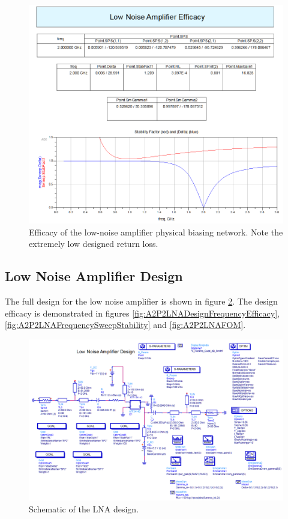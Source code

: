 \begin{figure}[H]
    \centering
    \includegraphics[width=0.8\linewidth]{Images/A2P2PhysicalResults.png}
    \caption{Efficacy of the low-noise amplifier physical biasing network. Note
    the extremely low designed return loss.}
    \label{fig:A2P2PhysicalResults}
\end{figure}

\subsection{Low Noise Amplifier Design}

The full design for the low noise amplifier is shown in figure
\ref{fig:A2P2LNASchematic}. The design efficacy is demonstrated in figures
\ref{fig:A2P2LNADesignFrequencyEfficacy},
\ref{fig:A2P2LNAFrequencySweepStability} and \ref{fig:A2P2LNAFOM}.

\begin{figure}[H]
    \centering
    \includegraphics[width=0.8\linewidth]{Images/A2P2LNASchematic.png}
    \caption{Schematic of the LNA design.}
    \label{fig:A2P2LNASchematic}
\end{figure}


